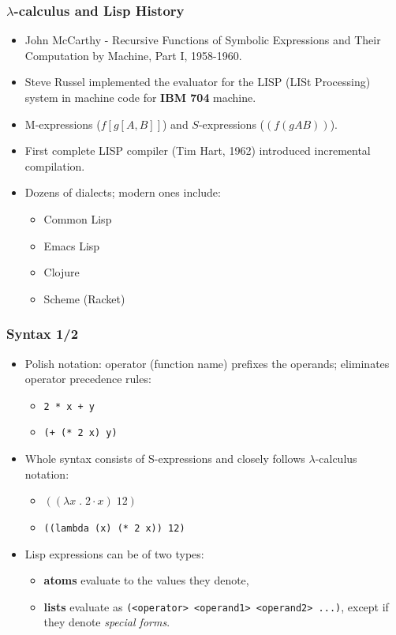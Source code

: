 \documentclass{beamer}
\begin{document}
\begin{frame}
  \frametitle{$\lambda$-calculus and Lisp History}
  \begin{itemize}
  \item John McCarthy - Recursive Functions of Symbolic Expressions and Their
    Computation by Machine, Part I, 1958-1960.
  \item Steve Russel implemented the evaluator for the LISP (LISt Processing)
    system in machine code for \textbf{IBM 704} machine.
  \item M-expressions ($f[g[A,B]]$) and $S$-expressions ($(f (g A B))$).
  \item First complete LISP compiler (Tim Hart, 1962) introduced incremental
    compilation.
  \item Dozens of dialects; modern ones include:
    \begin{itemize}
    \item Common Lisp
    \item Emacs Lisp
    \item Clojure
    \item Scheme (Racket)
    \end{itemize}
  \end{itemize}
\end{frame}

\begin{frame}
  \frametitle{Syntax 1/2}
  \begin{itemize}
  \item Polish notation: operator (function name) prefixes the operands;
    eliminates operator precedence rules:
    \begin{itemize}
    \item \texttt{2 * x + y}
    \item \texttt{(+ (* 2 x) y)}
    \end{itemize}
  \item Whole syntax consists of S-expressions and closely follows
    $\lambda$-calculus notation:
    \begin{itemize}
    \item $((\lambda x\;.\;2 \cdot x)\;12)$
    \item \texttt{((lambda (x) (* 2 x)) 12)}
    \end{itemize}
  \item Lisp expressions can be of two types:
    \begin{itemize}
    \item \textbf{atoms} evaluate to the values they denote,
    \item \textbf{lists} evaluate as
      \texttt{(<operator> <operand1> <operand2> ...)},
      except if they denote \textit{special forms}.
    \end{itemize}
  \end{itemize}
\end{frame}
\end{document}
